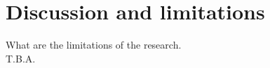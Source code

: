\documentclass[main.tex]{subfiles}
\begin{document}
    \section{Discussion and limitations}\label{sec:discussion}
    What are the limitations of the research.
    \\ 
    T.B.A. %
\end{document}
